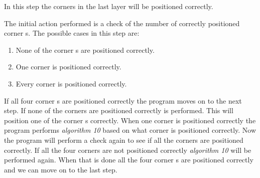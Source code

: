 In this step the corners in the last layer will be positioned correctly.

The initial action performed is a check of the number of correctly positioned corner \cpiece{}s.
The possible cases in this step are:
\begin{enumerate}
	\item None of the corner \cubie{}s are positioned correctly.
	\item One corner \cubie{} is positioned correctly.
	\item Every corner \cubie{} is positioned correctly.
\end{enumerate}

If all four corner \cpiece{}s are positioned correctly the program moves on to the next step.
If none of the corners are positioned correctly  is performed. This will position one of the corner \cpiece{}s correctly.
When one corner is positioned correctly the program performs \textit{algorithm 10} based on what corner is positioned correctly.
Now the program will perform a check again to see if all the corners are positioned correctly. If all the four corners are not positioned correctly \textit{algorithm 10} will be performed again.
When that is done all the four corner \cpiece{}s are positioned correctly and we can move on to the last step.